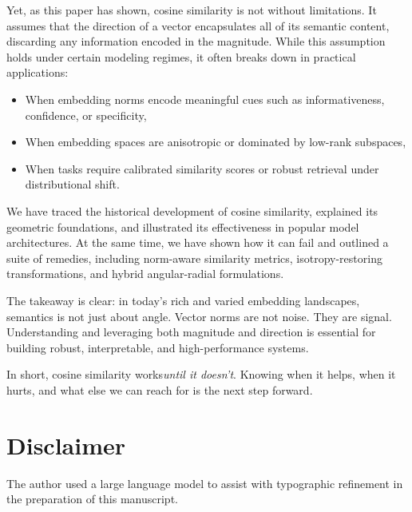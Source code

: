 \documentclass[11pt]{article}
\begin{document}
Yet, as this paper has shown, cosine similarity is not without limitations. It assumes that the direction of a vector encapsulates all of its semantic content, discarding any information encoded in the magnitude. While this assumption holds under certain modeling regimes, it often breaks down in practical applications:
\begin{itemize}
	\setlength\leftskip{-1em}          %
\item When embedding norms encode meaningful cues such as informativeness, confidence, or specificity,	
\item When embedding spaces are anisotropic or dominated by low-rank subspaces,
	\item When tasks require calibrated similarity scores or robust retrieval under distributional shift.
\end{itemize}

We have traced the historical development of cosine similarity, explained its geometric foundations, and illustrated its effectiveness in popular model architectures. At the same time, we have shown how it can fail and outlined a suite of remedies, including norm-aware similarity metrics, isotropy-restoring transformations, and hybrid angular-radial formulations.

The takeaway is clear:  in today’s rich and varied embedding landscapes, semantics is not just about angle. Vector norms are not noise. They are signal. Understanding and leveraging both magnitude and direction is essential for building robust, interpretable, and high-performance systems.

In short, cosine similarity works\textemdash\textit{until it doesn't}. Knowing when it helps, when it hurts, and what else we can reach for is the next step forward.

\section*{Disclaimer}

The author used a large language model to assist with typographic refinement in the preparation of this manuscript.



%
%




\end{document}
